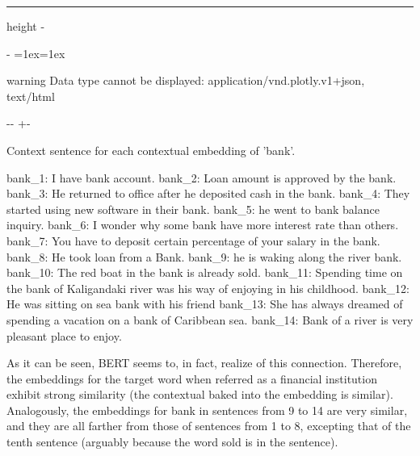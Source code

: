 \documentclass[letterpaper,10pt,english]{sphinxmanual}
\makeatletter
\newenvironment{nbsphinxfancyoutput}{%
    \let\sphinxincludegraphics\nbsphinxincludegraphics
    \nbsphinx@image@maxheight\textheight
    \advance\nbsphinx@image@maxheight -2\fboxsep   %
    \advance\nbsphinx@image@maxheight -2\fboxrule  %
    \advance\nbsphinx@image@maxheight -\baselineskip
\def\nbsphinxfcolorbox{\spx@fcolorbox{nbsphinx-code-border}{white}}%
\def\FrameCommand{\nbsphinxfcolorbox\nbsphinxfancyaddprompt\@empty}%
\def\FirstFrameCommand{\nbsphinxfcolorbox\nbsphinxfancyaddprompt\sphinxVerbatim@Continues}%
\def\MidFrameCommand{\nbsphinxfcolorbox\sphinxVerbatim@Continued\sphinxVerbatim@Continues}%
\def\LastFrameCommand{\nbsphinxfcolorbox\sphinxVerbatim@Continued\@empty}%
\MakeFramed{\advance\hsize-\width\@totalleftmargin\z@\linewidth\hsize\@setminipage}%
\lineskip=1ex\lineskiplimit=1ex\raggedright%
}{\par\unskip\@minipagefalse\endMakeFramed}
\def\nbsphinxfancyaddprompt{\ifvoid\nbsphinxpromptbox\else
    \kern\fboxrule\kern\fboxsep
    \copy\nbsphinxpromptbox
    \kern-\ht\nbsphinxpromptbox\kern-\dp\nbsphinxpromptbox
    \kern-\fboxsep\kern-\fboxrule\nointerlineskip
    \fi}
\newlength\nbsphinxcodecellspacing
\newcommand*{\nbsphinxincludegraphics}[2][]{%
    \gdef\spx@includegraphics@options{#1}%
    \setbox\spx@image@box\hbox{\texttt{[image: \#2]}}%
    \in@false
    \ifdim \wd\spx@image@box>\linewidth
      \g@addto@macro\spx@includegraphics@options{,width=\linewidth}%
      \in@true
    \fi
    \ifdim \ht\spx@image@box>\nbsphinx@image@maxheight
      \g@addto@macro\spx@includegraphics@options{,height=\nbsphinx@image@maxheight}%
      \in@true
    \fi
    \ifin@
      \g@addto@macro\spx@includegraphics@options{,keepaspectratio}%
    \fi
    \setbox\spx@image@box\box\voidb@x %
    \expandafter\includegraphics\expandafter[\spx@includegraphics@options]{#2}%
}%
\makeatother
\begin{document}
\hrule height -\fboxrule\relax
\vspace{\nbsphinxcodecellspacing}

\makeatletter\setbox\nbsphinxpromptbox\box\voidb@x\makeatother

\begin{nbsphinxfancyoutput}

\begin{sphinxadmonition}{warning}{}\unskip
Data type cannot be displayed: application/vnd.plotly.v1+json, text/html
\end{sphinxadmonition}

\end{nbsphinxfancyoutput}

{

\kern-\sphinxverbatimsmallskipamount\kern-\baselineskip
\kern+\FrameHeightAdjust\kern-\fboxrule
\vspace{\nbsphinxcodecellspacing}

\begin{sphinxVerbatim}[commandchars=\\\{\}]
Context sentence for each contextual embedding of 'bank'.

bank\_1: I have bank account.
bank\_2: Loan amount is approved by the bank.
bank\_3: He returned to office after he deposited cash in the bank.
bank\_4: They started using new software in their bank.
bank\_5: he went to bank balance inquiry.
bank\_6: I wonder why some bank have more interest rate than others.
bank\_7: You have to deposit certain percentage of your salary in the bank.
bank\_8: He took loan from a Bank.
bank\_9: he is waking along the river bank.
bank\_10: The red boat in the bank is already sold.
bank\_11: Spending time on the bank of Kaligandaki river was his way of enjoying in his childhood.
bank\_12: He was sitting on sea bank with his friend
bank\_13: She has always dreamed of spending a vacation on a bank of Caribbean sea.
bank\_14: Bank of a river is very pleasant place to enjoy.
\end{sphinxVerbatim}
}

As it can be seen, BERT seems to, in fact, realize of this connection. Therefore, the embeddings for the target word when referred as a financial institution exhibit strong similarity (the contextual baked into the embedding is similar). Analogously, the embeddings for bank in sentences from 9 to 14 are very similar, and they are all farther from those of sentences from 1 to 8, excepting that of the tenth sentence (arguably because the word sold is in the sentence).
\end{document}

